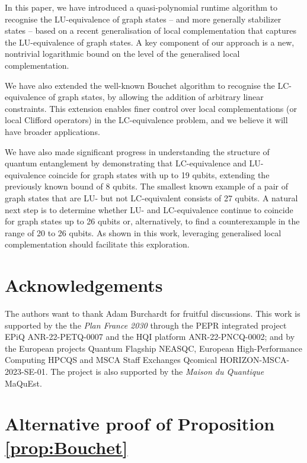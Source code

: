\documentclass[a4paper,UKenglish,cleveref,autoref,thm-restate]{arxiv}
\begin{document}
In this paper, we have introduced a quasi-polynomial runtime algorithm to recognise the LU-equivalence of graph states -- and more generally stabilizer states -- based on a recent generalisation of local complementation that captures the LU-equivalence of graph states. A key component of our approach is a new, nontrivial logarithmic bound on the level of the generalised local complementation.

We have also extended the well-known Bouchet algorithm to recognise the LC-equivalence of graph states, by allowing the addition of arbitrary linear constraints. This extension enables finer control over local complementations (or local Clifford operators) in the LC-equivalence problem, and we believe it will have broader applications.

We have also made significant progress in understanding the structure of quantum entanglement by demonstrating that LC-equivalence and LU-equivalence coincide for graph states with up to 19 qubits, extending the previously known bound of 8 qubits. 
The smallest known example of a pair of graph states that are LU- but not LC-equivalent consists of 27 qubits. A natural next step is to determine whether LU- and LC-equivalence continue to coincide for graph states up to 26 qubits or, alternatively, to find a counterexample in the range of 20 to 26 qubits. As shown in this work, leveraging generalised local complementation should facilitate this exploration.

\section*{Acknowledgements}
The authors want to thank Adam Burchardt for fruitful discussions. This work is supported by the the \emph{Plan France 2030} through the PEPR integrated project EPiQ ANR-22-PETQ-0007 and the HQI platform ANR-22-PNCQ-0002; and by the European projects Quantum Flagship NEASQC, European High-Performance Computing HPCQS and MSCA Staff Exchanges Qcomical HORIZON-MSCA-2023-SE-01. The project is also supported by the \emph{Maison du Quantique} MaQuEst. 






\appendix

\section{Alternative proof of Proposition \ref{prop:Bouchet}}
\label{app:Bouchet}
\end{document}
